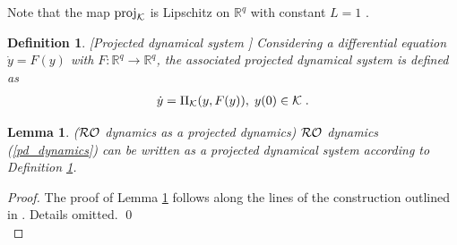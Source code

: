 \documentclass[journal,twoside,web]{ieeecolor}
\newtheorem{definition}{Definition}
\newtheorem{lemma}{Lemma}
\begin{document}
Note that the map $\text{proj}_{\cal K}$ is Lipschitz on $\mathbb R^q$ with constant $L=1$ \cite[Proposition~2.4.1]{clarke1983}. 

\begin{definition} \label{projected_dynamical_system} [Projected dynamical system \cite{nagurney1996}]
Considering a differential equation $\dot y=F(y)$ with $F:\mathbb R^q \rightarrow \mathbb R^q$, the associated projected dynamical system is defined as
\begin{align}
\label{projected_dynamics}
\dot y = \Pi_{\cal K}(y,F(y)),\; y(0) \in {\cal K}\;.
\end{align}
\end{definition}

\begin{lemma} \label{projected} (${\cal RO}$ dynamics as a projected dynamics)
${\cal RO}$ dynamics (\ref{pd_dynamics}) can be written as a projected dynamical system according to Definition \ref{projected_dynamical_system}.
\end{lemma}
\begin{proof}
The proof of Lemma \ref{projected} follows along the lines of the construction outlined in \cite{cherukuri2016}. Details omitted. \qed\\
\end{proof}

\end{document}
